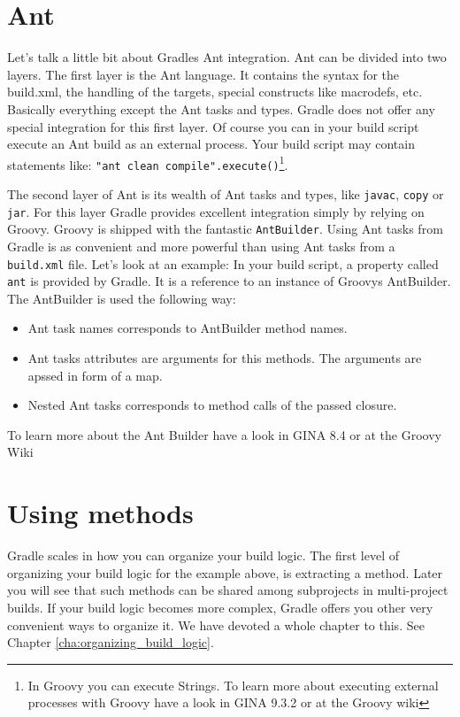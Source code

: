 \section{Ant}
Let's talk a little bit about Gradles Ant integration. Ant can be divided into two layers. The first layer is the Ant language. It contains the syntax for the build.xml, the handling of the targets, special constructs like macrodefs, etc. Basically everything except the Ant tasks and types. Gradle does not offer any special integration for this first layer. Of course you can in your build script execute an Ant build as an external process. Your build script may contain statements like: \texttt{"ant clean compile".execute()}\footnote{In Groovy you can execute Strings. To learn more about executing external processes with Groovy have a look in GINA 9.3.2 or at the Groovy wiki}.

The second layer of Ant is its wealth of Ant tasks and types, like \texttt{javac}, \texttt{copy} or \texttt{jar}. For this layer Gradle provides excellent integration simply by relying on Groovy. Groovy is shipped with the fantastic \texttt{AntBuilder}. Using Ant tasks from Gradle is as convenient and more powerful than using Ant tasks from a \texttt{build.xml} file. Let's look at an example:
In your build script, a property called \texttt{ant} is provided by Gradle. It is a reference to an instance of Groovys AntBuilder. The AntBuilder is used the following way:
\begin{itemize}
\item Ant task names corresponds to AntBuilder method names.
\item Ant tasks attributes are arguments for this methods. The arguments are apssed in form of a map.
\item Nested Ant tasks corresponds to method calls of the passed closure.
\end{itemize}
To learn more about the Ant Builder have a look in GINA 8.4 or at the Groovy Wiki

\section{Using methods}
Gradle scales in how you can organize your build logic. The first level of organizing your build logic for the example above, is extracting a method.
Later you will see that such methods can be shared among subprojects in multi-project builds. If your build logic becomes more complex, Gradle offers you other very convenient ways to organize it. We have devoted a whole chapter to this. See Chapter \ref{cha:organizing_build_logic}. 

